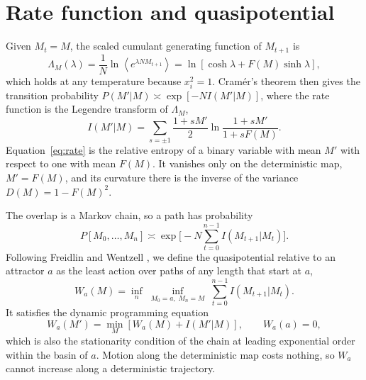 \documentclass[aps,pre,twocolumn,superscriptaddress,floatfix]{revtex4-2}
\begin{document}
\section{Rate function and quasipotential}

Given $M_t=M$, the scaled cumulant generating function of $M_{t+1}$ is
\begin{equation}
\Lambda_M(\lambda)=\frac1N\ln\left\langle e^{\lambda N M_{t+1}}\right\rangle=\ln\left[\cosh\lambda+F(M)\sinh\lambda\right],
\label{eq:scgf}
\end{equation}
which holds at any temperature because $x_i^2=1$. Cram\'er's theorem \cite{Touchette2009} then gives the transition probability $P(M'|M)\asymp\exp[-N I(M'|M)]$, where the rate function is the Legendre transform of $\Lambda_M$,
\begin{equation}
I(M'|M)=\sum_{s=\pm1}\frac{1+sM'}{2}\ln\frac{1+sM'}{1+sF(M)}.
\label{eq:rate}
\end{equation}
Equation~\eqref{eq:rate} is the relative entropy of a binary variable with mean $M'$ with respect to one with mean $F(M)$. It vanishes only on the deterministic map, $M'=F(M)$, and its curvature there is the inverse of the variance $D(M)=1-F(M)^2$.

The overlap is a Markov chain, so a path has probability
\begin{equation}
P[M_0,\dots,M_n]\asymp\exp\Big[-N\sum_{t=0}^{n-1}I(M_{t+1}|M_t)\Big].
\label{eq:path}
\end{equation}
Following Freidlin and Wentzell \cite{FreidlinWentzell,Kifer1988}, we define the quasipotential relative to an attractor $a$ as the least action over paths of any length that start at $a$,
\begin{equation}
W_a(M)=\inf_{n}\;\inf_{M_0=a,\;M_n=M}\;\sum_{t=0}^{n-1}I(M_{t+1}|M_t).
\label{eq:W}
\end{equation}
It satisfies the dynamic programming equation
\begin{equation}
W_a(M')=\min_{M}\left[W_a(M)+I(M'|M)\right],\qquad W_a(a)=0,
\label{eq:bellman}
\end{equation}
which is also the stationarity condition of the chain at leading exponential order within the basin of $a$. Motion along the deterministic map costs nothing, so $W_a$ cannot increase along a deterministic trajectory.
\end{document}
